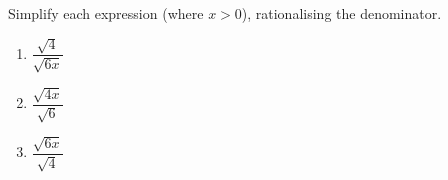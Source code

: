 Simplify each expression (where $x>0$), rationalising the denominator.
\begin{enumerate}
\item[(a)] $\dfrac{\sqrt4}{\sqrt{6x}}$
\item[(b)] $\dfrac{\sqrt{4x}}{\sqrt6}$
\item[(c)] $\dfrac{\sqrt{6x}}{\sqrt4}$
\end{enumerate}
